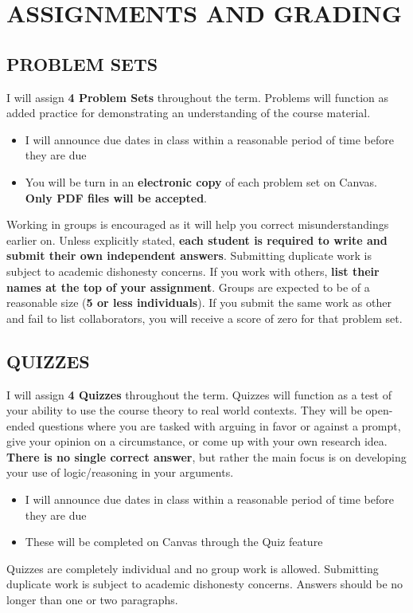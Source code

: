 \documentclass[11pt]{article}
\begin{document}
\bigskip 

\section*{ASSIGNMENTS AND GRADING}



\bigskip 

\subsection*{PROBLEM SETS}
I will assign \textbf{4 Problem Sets} throughout the term. 
Problems will function as added practice for demonstrating an understanding of the course material. 

\begin{itemize}
    \item I will announce due dates in class within a reasonable period of time before they are due
    \item You will be turn in an \textbf{electronic copy} of each problem set on Canvas. 
    \textbf{Only PDF files will be accepted}.
\end{itemize}
Working in groups is encouraged as it will help you correct misunderstandings earlier on. 
Unless explicitly stated, \textbf{each student is required to write and submit their own independent answers}. 
Submitting duplicate work is subject to academic dishonesty concerns. 
If you work with others, \textbf{list their names at the top of your assignment}. 
Groups are expected to be of a reasonable size (\textbf{5 or less individuals}). 
If you submit the same work as other and fail to list collaborators, you will receive a score of zero for that problem set. 

\subsection*{QUIZZES}
I will assign \textbf{4 Quizzes} throughout the term. 
Quizzes will function as a test of your ability to use the course theory to real world contexts. 
They will be open-ended questions where you are tasked with arguing in favor or against a prompt, give your opinion on a circumstance, or come up with your own research idea. 
\textbf{There is no single correct answer}, but rather the main focus is on developing your use of logic/reasoning in your arguments. 

\begin{itemize}
    \item I will announce due dates in class within a reasonable period of time before they are due
    \item These will be completed on Canvas through the Quiz feature
\end{itemize}
Quizzes are completely individual and no group work is allowed. 
Submitting duplicate work is subject to academic dishonesty concerns. 
Answers should be no longer than one or two paragraphs. 
\end{document}
